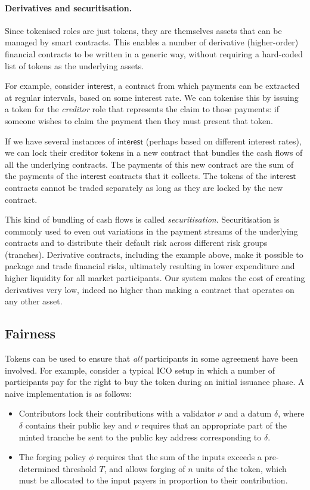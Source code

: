 \paragraph{Derivatives and securitisation.}
%
Since tokenised roles are just tokens, they are themselves assets that can be managed by smart contracts.
This enables a number of derivative (higher-order) financial contracts to be written in a generic way, without requiring a hard-coded list of tokens as the underlying assets.

For example, consider $\mathsf{interest}$, a contract from which payments can be extracted at regular intervals, based on some interest rate.
We can tokenise this by issuing a token for the \emph{creditor} role that represents the claim to those payments: if someone wishes to claim the payment then they must present that token.

If we have several instances of $\mathsf{interest}$ (perhaps based on different interest rates), we can lock their creditor tokens in a new contract that bundles the cash flows of all the underlying contracts.
The payments of this new contract are the sum of the payments of the $\mathsf{interest}$ contracts that it collects.
The tokens of the $\mathsf{interest}$ contracts cannot be traded separately as long as they are locked by the new contract.

This kind of bundling of cash flows is called \emph{securitisation}.
Securitisation is commonly used to even out variations in the payment streams of the underlying contracts and to distribute their default risk across different risk groups (tranches).
Derivative contracts, including the example above, make it possible to package and trade financial risks, ultimately resulting in lower expenditure and higher liquidity for all market participants.
Our system makes the cost of creating derivatives very low, indeed no higher than making a contract that operates on any other asset.

\subsection{Fairness}

Tokens can be used to ensure that \emph{all} participants in some agreement have been involved. For example, consider a typical ICO setup in which a number of participants pay for the right to buy the token during an initial issuance phase.
A naive implementation is as follows:
%
\begin{itemize}
\item
  Contributors lock their contributions with a validator $\nu$ and a datum $\delta$, where $\delta$ contains their public key and $\nu$ requires that an appropriate part of the minted tranche be sent to the public key address corresponding to $\delta$.
\item
  The forging policy $\phi$ requires that the sum of the inputs exceeds a pre-determined  threshold $T$, and allows forging of $n$ units of the token, which must be allocated to the input payers in proportion to their contribution.
\end{itemize}

